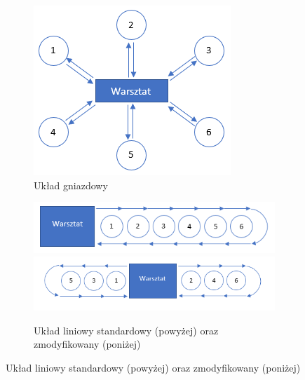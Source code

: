 \documentclass[12pt, a4paper, oneside]{mwart} %
\begin{document}
\begin{figure}
\caption{Schematy rozmieszczenia maszyn na~hali produkcyjnej}
\label{uklady_hali}
\begin{subfigure}{0.3\textwidth}
\centering
\includegraphics[width = \textwidth]{wykresy/ukl_gniazdowy.png}
\caption{Układ gniazdowy}
\end{subfigure}
\hfill
\begin{subfigure}{0.5\textwidth}
\centering
\includegraphics[width = \textwidth]{wykresy/ukl_liniowy.png}
\newline
\includegraphics[width = \textwidth]{wykresy/ukl_liniowy_zm.png}
\caption{Układ liniowy standardowy (powyżej) oraz zmodyfikowany (poniżej)}
\end{subfigure}
\end{figure}
\end{document}
